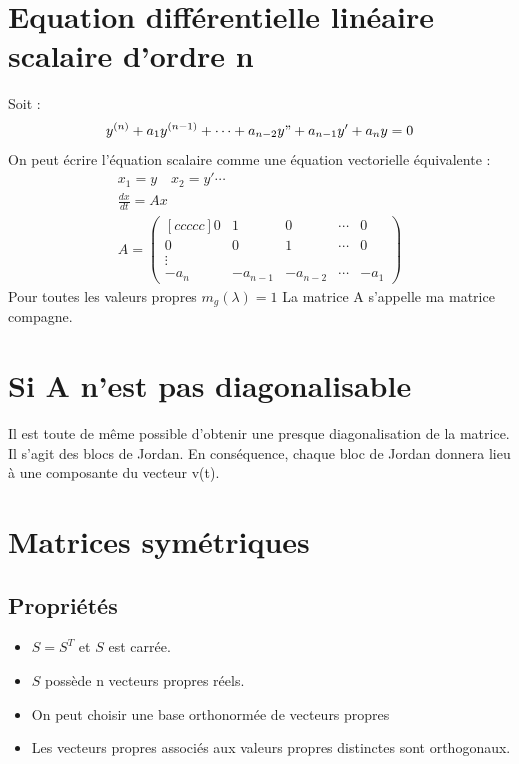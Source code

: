 \documentclass[a4paper]{book}
\begin{document}
\section{Equation différentielle linéaire scalaire d'ordre n}
Soit :
\begin{gather}
    y^{(n)}+a_1y^{(n-1)}+\cdots+a_{n-2}y"+a_{n-1}y'+a_{n}y=0
\end{gather}
On peut écrire l'équation scalaire comme une équation vectorielle équivalente :
\begin{gather}
    x_1 = y \quad x_2 = y' \cdots \\
    \frac{dx}{dt} = Ax \\
    A = \begin{pmatrix}[ccccc]
    0&1&0&\cdots&0 \\
    0&0&1&\cdots&0\\
    \vdots&&&&\\
    -a_n&-a_{n-1}&-a_{n-2}&\cdots&-a_1
    \end{pmatrix}
\end{gather}
Pour toutes les valeurs propres $m_g(\lambda) = 1$ La matrice A s'appelle ma matrice compagne.
\section{Si A n'est pas diagonalisable}
Il est toute de même possible d'obtenir une presque diagonalisation de la matrice. Il s'agit des blocs de Jordan. En conséquence, chaque bloc de Jordan donnera lieu à une composante du vecteur v(t).
\section{Matrices symétriques}
\subsection{Propriétés}
\begin{itemize}
    \item $S = S^T$ et $S$ est carrée.
    \item $S$ possède n vecteurs propres réels.
    \item On peut choisir une base orthonormée de vecteurs propres
    \item Les vecteurs propres associés aux valeurs propres distinctes sont orthogonaux.
\end{itemize}
\end{document}
